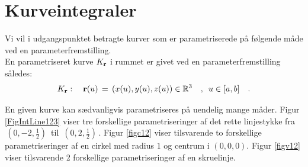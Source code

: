 \section{Kurveintegraler} \label{secKurveInt}

Vi vil i udgangspunktet betragte kurver som er parametriserede på følgende måde ved
en parameterfremstilling. \\


En parametriseret kurve $K_{\bf r}$ i rummet er givet ved en
parameterfremstilling således:
\begin{equation}
\label{eqKr}
K_{\bf r}: \quad {\bf r}(u) \, = \, \left(x(u), y(u), z(u)\right)
\in \mathbb{R}^3 \quad , \, \, \,  u \in [a,b] \quad.
\end{equation}

\begin{aha}
En given kurve kan sædvanligvis parametriseres på uendelig mange måder.
Figur \ref{FigIntLine123} viser tre forskellige
parametriseringer af det rette linjestykke fra
$\, (0, -2, \frac{1}{2})\, $ til $\, (0, 2,
\frac{1}{2})\, $. Figur \ref{figc12} viser
tilsvarende to forskellige parametriseringer af
en cirkel med radius $1$ og centrum i $(0, 0,
0)$. Figur \ref{figv12} viser tilsvarende 2
forskellige parametriseringer af en skruelinje.
\end{aha}

